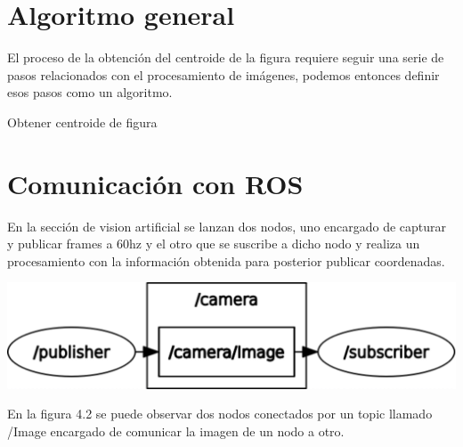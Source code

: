 
\section{Algoritmo general}
El proceso de la obtención del centroide de la figura requiere seguir una serie de pasos relacionados con el
procesamiento de imágenes, podemos entonces definir esos pasos como un algoritmo.

\begin{algorithm}
	\caption{Obtener centroide de figura}
	\begin{algorithmic}[1]
	\end{algorithmic}
\end{algorithm}




\section{Comunicación con ROS}
En la sección de vision artificial se lanzan dos nodos, uno encargado de capturar y
publicar frames a 60hz y el otro que se suscribe a dicho nodo y realiza un procesamiento
con la información obtenida para posterior publicar coordenadas.
\begin{center}
	\includegraphics[width=0.56 \textwidth]{Contenido/Cuerpo/Capitulo4/Fig0.eps}
	\label{Fig1}
\end{center}
En la figura 4.2 se puede observar dos nodos conectados por un topic llamado /Image
encargado de comunicar la imagen de un nodo a otro.
